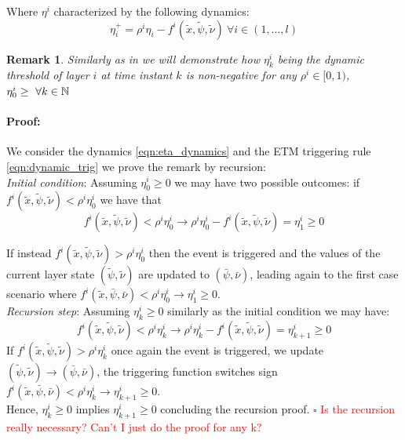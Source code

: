 \documentclass{ifacconf}
\theoremstyle{plain}
\newtheorem{remark}{Remark}
\newenvironment{proof}{\paragraph*{Proof:}}{\hfill$\square$}
\begin{document}
Where $\eta^i$ characterized by the following dynamics:
\begin{equation}\label{eqn:eta_dynamics}
  \eta^+_i = \rho^i \eta_i - f^i(\tilde{x}, \tilde{\psi}, \tilde{\nu})\  \forall i \in \left( 1, \dots, l \right) 
\end{equation}

\begin{remark} \emph{Similarly as in \citep[Lemma 3]{data-driven} we will demonstrate how $\eta^i_k$ being the dynamic threshold of layer $i$ at time instant $k$ is non-negative for any $\rho^i \in [0, 1)$, $\eta^i_0 \geq\ \forall k \in {\mathbb{N}}$} \end{remark}

\begin{proof} We consider the dynamics \eqref{eqn:eta_dynamics} and the ETM triggering rule \eqref{eqn:dynamic_trig} we prove the remark by recursion:\\
\emph{Initial condition}: Assuming $\eta^i_0 \geq 0$ we may have two possible outcomes:
if $f^i(\tilde{x}, \tilde{\psi}, \tilde{\nu}) < \rho^i \eta^i_0$ we have that 
\begin{equation}
  f^i(\tilde{x}, \tilde{\psi}, \tilde{\nu}) < \rho^i \eta^i_0 \to \rho^i \eta^i_0 - f^i(\tilde{x}, \tilde{\psi}, \tilde{\nu}) = \eta^i_1 \geq 0
\end{equation}

If instead $f^i(\tilde{x}, \tilde{\psi}, \tilde{\nu}) > \rho^i \eta^i_0$ then the event is triggered and the values of the current layer state $(\tilde{\psi}, \tilde{\nu})$ are updated to $(\bar{\psi}, \bar{\nu})$, leading again to the first case scenario where $f^i(\tilde{x}, \bar{\psi}, \bar{\nu}) < \rho^i \eta^i_0 \to \eta^i_1 \geq 0$.\\
\emph{Recursion step}: Assuming $\eta^i_k \geq 0$ similarly as the initial condition we may have:
$$
f^i(\tilde{x}, \tilde{\psi}, \tilde{\nu}) < \rho^i \eta^i_k \to \rho^i \eta^i_k - f^i(\tilde{x}, \tilde{\psi}, \tilde{\nu}) = \eta^i_{k+1} \geq 0
$$
If $f^i(\tilde{x}, \tilde{\psi}, \tilde{\nu}) > \rho^i \eta^i_k$ once again the event is triggered, we update $(\tilde{\psi}, \tilde{\nu}) \to (\bar{\psi}, \bar{\nu})$, the triggering function switches sign $f^i(\tilde{x}, \bar{\psi}, \bar{\nu}) < \rho^i \eta^i_k \to \eta^i_{k+1} \geq 0$.\\
Hence, $\eta^i_k \geq 0$ implies $\eta^i_{k+1} \geq 0$ concluding the recursion proof. \end{proof}
\textcolor{red}{Is the recursion really necessary? Can't I just do the proof for any k?}
\end{document}
